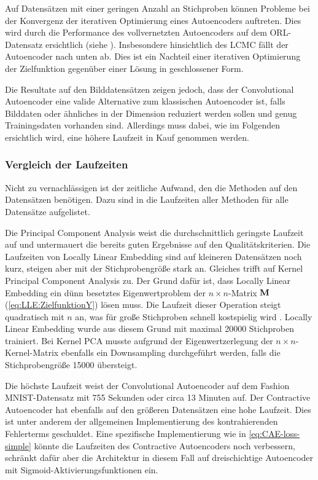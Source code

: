 Auf Datensätzen mit einer geringen Anzahl an Stichproben können Probleme bei der Konvergenz der iterativen Optimierung eines Autoencoders auftreten. Dies wird durch die Performance des vollvernetzten Autoencoders auf dem ORL-Datensatz ersichtlich (siehe ). Insbesondere hinsichtlich des LCMC fällt der Autoencoder nach unten ab. Dies ist ein Nachteil einer iterativen Optimierung der Zielfunktion gegenüber einer Lösung in geschlossener Form.

Die Resultate auf den Bilddatensätzen zeigen jedoch, dass der Convolutional Autoencoder eine valide
Alternative zum klassischen Autoencoder ist, falls Bilddaten oder ähnliches in der Dimension
reduziert werden sollen und genug Trainingsdaten vorhanden sind. Allerdings muss dabei, wie im
Folgenden ersichtlich wird, eine höhere Laufzeit in Kauf genommen werden.

\subsubsection{Vergleich der Laufzeiten}

Nicht zu vernachlässigen ist der zeitliche Aufwand, den die Methoden auf den Datensätzen benötigen.
Dazu sind in  die Laufzeiten aller Methoden für alle Datensätze
aufgelistet.


Die Principal Component Analysis weist die durchschnittlich geringste Laufzeit auf und untermauert die bereits guten Ergebnisse auf den Qualitätskriterien. Die Laufzeiten von Locally Linear Embedding sind auf kleineren Datensätzen noch kurz, steigen aber mit der Stichprobengröße stark an. Gleiches trifft auf Kernel Principal Component Analysis zu. Der Grund dafür ist, dass Locally Linear Embedding ein dünn besetztes Eigenwertproblem der $n \times n$-Matrix $\mathbf{M}$ (\eqref{eq:LLE:ZielfunktionY}) lösen muss. Die Laufzeit dieser Operation steigt quadratisch mit $n$ an, was für große Stichproben schnell kostspielig wird \parencite[9]{Saul.2000}. Locally Linear Embedding wurde aus diesem Grund mit maximal \num{20000}
Stichproben trainiert. Bei Kernel PCA musste aufgrund der Eigenwertzerlegung der $n \times
	n$-Kernel-Matrix ebenfalls ein Downsampling durchgeführt werden, falls die Stichprobengröße
\num{15000} übersteigt.

Die höchste Laufzeit weist der Convolutional Autoencoder auf dem Fashion MNIST-Datensatz mit 755
Sekunden oder circa 13 Minuten auf. Der Contractive Autoencoder hat ebenfalls auf den größeren
Datensätzen eine hohe Laufzeit. Dies ist unter anderem der allgemeinen Implementierung des
kontrahierenden Fehlerterms geschuldet. Eine spezifische Implementierung wie in
\eqref{eq:CAE-loss-simple} könnte die Laufzeiten des Contractive Autoencoders noch verbessern,
schränkt dafür aber die Architektur in diesem Fall auf dreischichtige Autoencoder mit
Sigmoid-Aktivierungsfunktionen ein.

